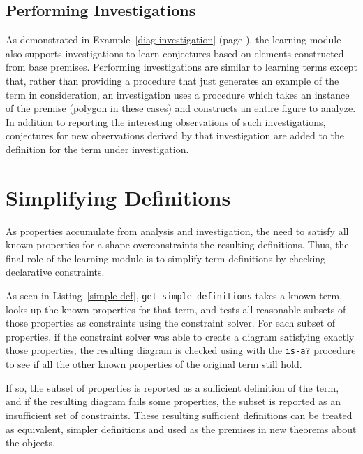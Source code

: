 \subsection{Performing Investigations}

As demonstrated in Example~\ref{diag-investigation} (page
\pageref{diag-investigation}), the learning module also supports
investigations to learn conjectures based on elements constructed from
base premises.  Performing investigations are similar to learning
terms except that, rather than providing a procedure that just
generates an example of the term in consideration, an investigation
uses a procedure which takes an instance of the premise (polygon in
these cases) and constructs an entire figure to analyze. In addition
to reporting the interesting observations of such investigations,
conjectures for new observations derived by that investigation are
added to the definition for the term under investigation.

\section{Simplifying Definitions}

As properties accumulate from analysis and investigation, the need to
satisfy all known properties for a shape overconstraints the resulting
definitions. Thus, the final role of the learning module is to
simplify term definitions by checking declarative constraints.

As seen in Listing~\ref{simple-def}, \texttt{get-simple-definitions}
takes a known term, looks up the known properties for that term, and
tests all reasonable subsets of those properties as constraints using
the constraint solver. For each subset of properties, if the
constraint solver was able to create a diagram satisfying exactly
those properties, the resulting diagram is checked using with the
\texttt{is-a?} procedure to see if all the other known properties of
the original term still hold.

If so, the subset of properties is reported as a sufficient definition
of the term, and if the resulting diagram fails some properties, the
subset is reported as an insufficient set of constraints. These
resulting sufficient definitions can be treated as equivalent, simpler
definitions and used as the premises in new theorems about the
objects.

